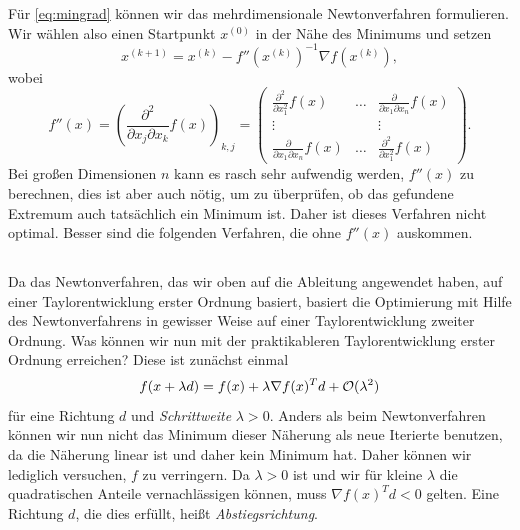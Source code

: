 Für \eqref{eq:mingrad} können wir das mehrdimensionale Newtonverfahren
formulieren. Wir wählen also einen Startpunkt $x^{(0)}$ in der Nähe
des Minimums und setzen
\begin{equation}
  x^{(k+1)} = x^{(k)} - f''\left(x^{(k)}\right)^{-1}\nabla f\left(x^{(k)}\right),
\end{equation}
wobei
\begin{equation}
  f''(x) = 
  \left(\frac{\partial^2}{\partial x_j\partial x_k}f(x)\right)_{k,j} = 
  \begin{pmatrix}
    \frac{\partial^2}{\partial x_1^2}f(x) & \ldots &
    \frac{\partial}{\partial x_1\partial x_n}f(x)\\
    \vdots               &        & \vdots \\
    \frac{\partial}{\partial x_1\partial x_n}f(x) & \ldots &
    \frac{\partial^2}{\partial x_1^2}f(x)
  \end{pmatrix}.
\end{equation}
Bei großen Dimensionen $n$ kann es rasch sehr aufwendig werden,
$f''(x)$ zu berechnen, dies ist aber auch nötig, um zu überprüfen,
ob das gefundene Extremum auch tatsächlich ein Minimum ist. Daher
ist dieses Verfahren nicht optimal. Besser sind die folgenden
Verfahren, die ohne $f''(x)$ auskommen.

\subsection{}

Da das Newtonverfahren, das wir oben auf die Ableitung angewendet
haben, auf einer Taylorentwicklung erster Ordnung
basiert, basiert die Optimierung mit Hilfe des Newtonverfahrens in
gewisser Weise auf einer Taylorentwicklung zweiter Ordnung. Was können
wir nun mit der praktikableren Taylorentwicklung erster Ordnung
erreichen? Diese ist zunächst einmal
\begin{equation}
  \label{eq:steepestdescentexpand}
  f(x + \lambda d) = f(x) + \lambda \nabla f(x)^Td + \mathcal O(\lambda^2)
\end{equation}
für eine Richtung $d$ und \emph{Schrittweite} $\lambda > 0$.  Anders
als beim Newtonverfahren können wir nun nicht das Minimum dieser
Näherung als neue Iterierte benutzen, da die Näherung linear ist und
daher kein Minimum hat. Daher können wir lediglich versuchen, $f$ zu
verringern. Da $\lambda>0$ ist und wir für kleine $\lambda$ die
quadratischen Anteile vernachlässigen können, muss $\nabla f(x)^Td < 0$
gelten. Eine Richtung $d$, die dies erfüllt, heißt
\emph{Abstiegsrichtung}.

